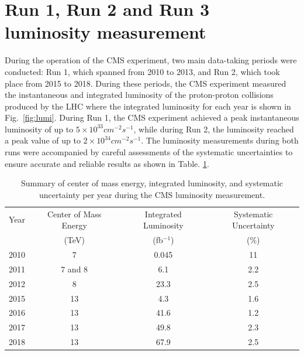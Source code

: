 \section{Run 1, Run 2 and Run 3 luminosity measurement}

During the operation of the CMS experiment, two main data-taking periods were conducted: Run 1, which spanned from 2010 to 2013, and Run 2, which took place from 2015 to 2018. During these periods, the CMS experiment measured the instantaneous and integrated luminosity of the proton-proton collisions produced by the LHC where the integrated luminosity for each year is shown in Fig.~\ref{fig:lumi}. During Run 1, the CMS experiment achieved a peak instantaneous luminosity of up to $5 \times 10^{33} cm^{-2} s^{-1}$, while during Run 2, the luminosity reached a peak value of up to $2 \times 10^{34} cm^{-2} s^{-1}$. The luminosity measurements during both runs were accompanied by careful assessments of the systematic uncertainties to ensure accurate and reliable results \cite{CMS-PAS-EWK-10-004, CMS-PAS-EWK-11-001, CMS-PAS-SMP-12-008, CMS-PAS-LUM-13-001, Sirunyan:2759951, pas_17, pas_18} as shown in Table. \ref{tab:lumi}.


\begin{table}[h]
  \centering
  \caption[Integrated luminosity and its precision for Run1 and Run2]{Summary of center of mass energy, integrated luminosity, and systematic uncertainty per year during the CMS luminosity measurement.}
\begin{tabular}{c c c c}
  Year & Center of Mass Energy & Integrated Luminosity & Systematic Uncertainty \\
  & (TeV) & (fb$^{-1}$) & (\%) \\
\hline
2010 & 7 & 0.045 & 11 \\
2011 & 7 and 8 & 6.1 & 2.2 \\
2012 & 8 & 23.3 & 2.5 \\
2015 & 13 & 4.3 & 1.6 \\
2016 & 13 & 41.6 & 1.2 \\
2017 & 13 & 49.8 & 2.3 \\
2018 & 13 & 67.9 &  2.5\\
\end{tabular}
\label{tab:lumi}
\end{table}


